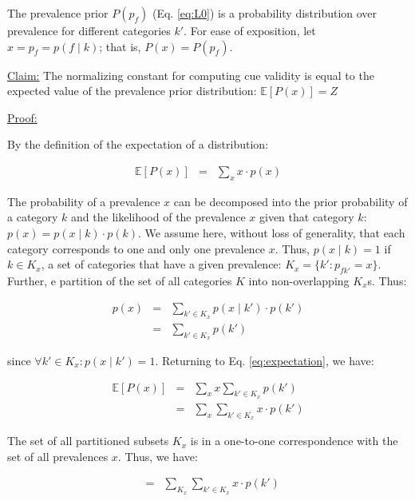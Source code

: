 \documentclass[english,floatsintext,man]{apa6}
\theoremstyle{definition}
\theoremstyle{definition}
\theoremstyle{definition}
\theoremstyle{remark}
\begin{document}
The prevalence prior \(P(p_f)\) (Eq. \ref{eq:L0}) is a probability
distribution over prevalence for different categories \(k'\). For ease
of exposition, let \(x = p_f = p(f \mid k)\); that is,
\(P(x) = P(p_f)\).

\underline{Claim:} The normalizing constant for computing cue validity
is equal to the expected value of the prevalence prior distribution:
\(\mathbb{E}[P(x)] = Z\)

\underline{Proof:}

By the definition of the expectation of a distribution:

\begin{eqnarray} \label{eq:expectation}
\mathbb{E}[P(x)] & = & \sum\limits_{x} x \cdot p(x) 
\end{eqnarray}

The probability of a prevalence \(x\) can be decomposed into the prior
probability of a category \(k\) and the likelihood of the prevalence
\(x\) given that category \(k\): \(p(x) = p(x \mid k) \cdot p(k)\). We
assume here, without loss of generality, that each category corresponds
to one and only one prevalence \(x\). Thus, \(p(x \mid k) = 1\) if
\(k \in K_x\), a set of categories that have a given prevalence:
\(K_x = \{k' : p_{fk'} = x\}\). Further, e partition of the set of all
categories \(K\) into non-overlapping \(K_x\)s. Thus:

\begin{eqnarray} \label{eq:prevToKinds}
p(x) & = & \sum\limits_{k' \in K_x} p(x \mid k') \cdot p( k') \nonumber \\
     & = & \sum\limits_{k' \in K_x} p(k')
\end{eqnarray}

since \(\forall k' \in K_{x}: p(x \mid k') = 1\). Returning to Eq.
\ref{eq:expectation}, we have:

\begin{eqnarray} \label{eq:eq3}
\mathbb{E}[P(x)] & = & \sum\limits_{x} x \sum\limits_{k' \in K_x} p(k') \nonumber \\
                  & = & \sum\limits_{x} \sum\limits_{k' \in K_x} x \cdot p(k')
\end{eqnarray}

The set of all partitioned subsets \(K_x\) is in a one-to-one
correspondence with the set of all prevalences \(x\). Thus, we have:

\begin{eqnarray} \label{eq:bijection}
  & = & \sum\limits_{K_x} \sum\limits_{k' \in K_x} x \cdot p( k')
\end{eqnarray}
\end{document}
